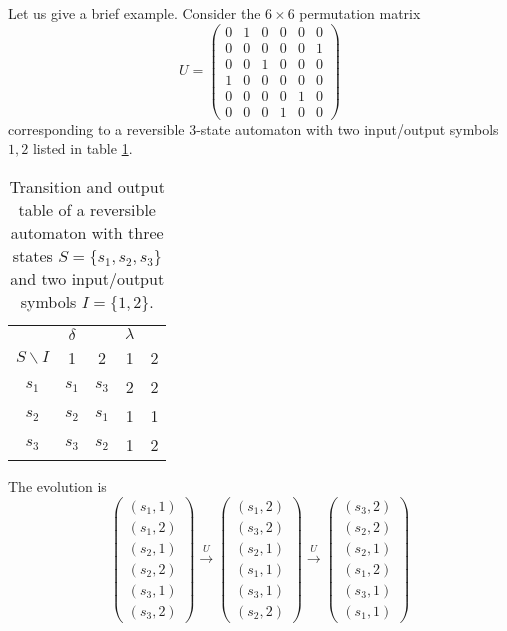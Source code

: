 \documentclass[pra,amsfonts,twocolumn]{revtex4}
\begin{document}
Let us give a brief example. Consider the $6\times 6$ permutation matrix
$$
U=
\left(
\begin{array}{cccccc}
0&1&0&0&0&0\\
0&0&0&0&0&1\\
0&0&1&0&0&0\\
1&0&0&0&0&0\\
0&0&0&0&1&0\\
0&0&0&1&0&0
\end{array}
\right)
$$
corresponding to a reversible $3$-state automaton with two input/output
symbols $1,2$
listed in table
\ref{t-rra}.
\begin{table}
\begin{center}
\begin{tabular}{|c|cc|cc|}
 \hline
 \hline
 &$\delta$ & & $\lambda$&\\
$S\backslash I$ &1&2& 1&2\\
 \hline
$s_1$&$s_1$&$s_3$ & 2&2\\
$s_2$&$s_2$&$s_1 $& 1&1\\
$s_3$&$s_3$&$s_2 $& 1&2\\
 \hline
 \hline
\end{tabular}
\end{center}
\caption{Transition and output table of a reversible
automaton with three states $S=\{s_1, s_2, s_3\}$ and two input/output
symbols $I= \{1,2\}$.\label{t-rra}}
\end{table}
The evolution is
$$
\left(
\begin{array}{c}
(s_1,1)                \\
(s_1,2)                \\
(s_2,1)                \\
(s_2,2)                \\
(s_3,1)                \\
(s_3,2)
\end{array}
\right)
\stackrel{U}{\longrightarrow }
\left(
\begin{array}{c}
(s_1,2)                \\
(s_3,2)                \\
(s_2,1)                \\
(s_1,1)                \\
(s_3,1)                \\
(s_2,2)
\end{array}
\right)
\stackrel{U}{\longrightarrow }
\left(
\begin{array}{c}
(s_3,2)                \\
(s_2,2)                \\
(s_2,1)                \\
(s_1,2)                \\
(s_3,1)                \\
(s_1,1)
\end{array}
\right)
$$
\end{document}
